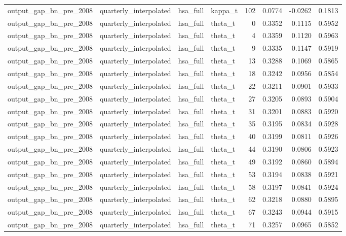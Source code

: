 \begin{tabular}{llllrrrr}
output\_gap\_bn\_pre\_2008 & quarterly\_interpolated & hsa\_full & kappa\_t & 102 & 0.0774 & -0.0262 & 0.1813 \\
output\_gap\_bn\_pre\_2008 & quarterly\_interpolated & hsa\_full & theta\_t & 0 & 0.3352 & 0.1115 & 0.5952 \\
output\_gap\_bn\_pre\_2008 & quarterly\_interpolated & hsa\_full & theta\_t & 4 & 0.3359 & 0.1120 & 0.5963 \\
output\_gap\_bn\_pre\_2008 & quarterly\_interpolated & hsa\_full & theta\_t & 9 & 0.3335 & 0.1147 & 0.5919 \\
output\_gap\_bn\_pre\_2008 & quarterly\_interpolated & hsa\_full & theta\_t & 13 & 0.3288 & 0.1069 & 0.5865 \\
output\_gap\_bn\_pre\_2008 & quarterly\_interpolated & hsa\_full & theta\_t & 18 & 0.3242 & 0.0956 & 0.5854 \\
output\_gap\_bn\_pre\_2008 & quarterly\_interpolated & hsa\_full & theta\_t & 22 & 0.3211 & 0.0901 & 0.5933 \\
output\_gap\_bn\_pre\_2008 & quarterly\_interpolated & hsa\_full & theta\_t & 27 & 0.3205 & 0.0893 & 0.5904 \\
output\_gap\_bn\_pre\_2008 & quarterly\_interpolated & hsa\_full & theta\_t & 31 & 0.3201 & 0.0883 & 0.5920 \\
output\_gap\_bn\_pre\_2008 & quarterly\_interpolated & hsa\_full & theta\_t & 35 & 0.3195 & 0.0834 & 0.5928 \\
output\_gap\_bn\_pre\_2008 & quarterly\_interpolated & hsa\_full & theta\_t & 40 & 0.3199 & 0.0811 & 0.5926 \\
output\_gap\_bn\_pre\_2008 & quarterly\_interpolated & hsa\_full & theta\_t & 44 & 0.3190 & 0.0806 & 0.5923 \\
output\_gap\_bn\_pre\_2008 & quarterly\_interpolated & hsa\_full & theta\_t & 49 & 0.3192 & 0.0860 & 0.5894 \\
output\_gap\_bn\_pre\_2008 & quarterly\_interpolated & hsa\_full & theta\_t & 53 & 0.3194 & 0.0838 & 0.5921 \\
output\_gap\_bn\_pre\_2008 & quarterly\_interpolated & hsa\_full & theta\_t & 58 & 0.3197 & 0.0841 & 0.5924 \\
output\_gap\_bn\_pre\_2008 & quarterly\_interpolated & hsa\_full & theta\_t & 62 & 0.3218 & 0.0880 & 0.5895 \\
output\_gap\_bn\_pre\_2008 & quarterly\_interpolated & hsa\_full & theta\_t & 67 & 0.3243 & 0.0944 & 0.5915 \\
output\_gap\_bn\_pre\_2008 & quarterly\_interpolated & hsa\_full & theta\_t & 71 & 0.3257 & 0.0965 & 0.5852 \\

\end{tabular}
